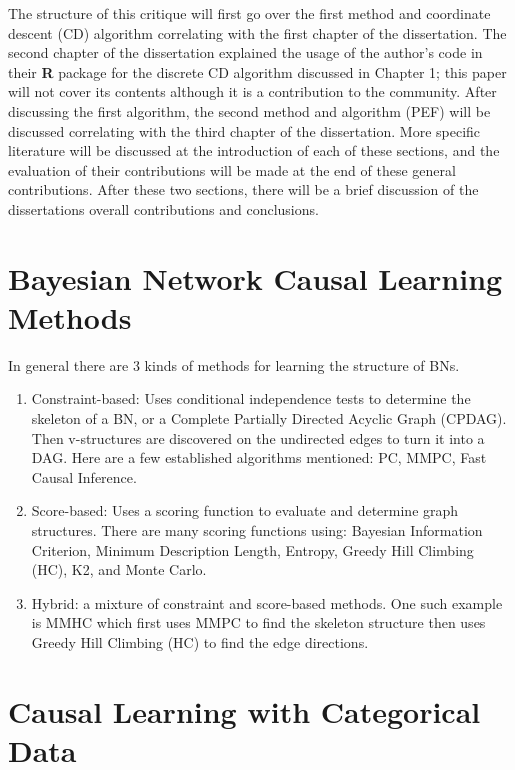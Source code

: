 \documentclass[twoside,11pt]{article}
\begin{document}
The structure of this critique will first go over the first method and coordinate descent (CD) algorithm correlating with the first chapter of the dissertation. The second chapter of the dissertation explained the usage of the author's code in their \textbf{R} package for the discrete CD algorithm discussed in Chapter 1; this paper will not cover its contents although it is a contribution to the community. After discussing the first algorithm, the second method and algorithm (PEF) will be discussed correlating with the third chapter of the dissertation. More specific literature will be discussed at the introduction of each of these sections, and the evaluation of their contributions will be made at the end of these general contributions. After these two sections, there will be a brief discussion of the dissertations overall contributions and conclusions.

\section{Bayesian Network Causal Learning Methods}

In general there are 3 kinds of methods for learning the structure of BNs.\begin{enumerate}[1.]
    \item Constraint-based: Uses conditional independence tests to determine the skeleton of a BN, or a Complete Partially Directed Acyclic Graph (CPDAG). Then v-structures are discovered on the undirected edges to turn it into a DAG. Here are a few established algorithms mentioned: PC, MMPC, Fast Causal Inference. 
    \item Score-based: Uses a scoring function to evaluate and determine graph structures. There are many scoring functions using: Bayesian Information Criterion, Minimum Description Length, Entropy, Greedy Hill Climbing (HC), K2, and Monte Carlo.
    \item Hybrid: a mixture of constraint and score-based methods. One such example is MMHC which first uses MMPC to find the skeleton structure then uses Greedy Hill Climbing (HC) to find the edge directions.
\end{enumerate}


\section{Causal Learning with Categorical Data}
\end{document}
